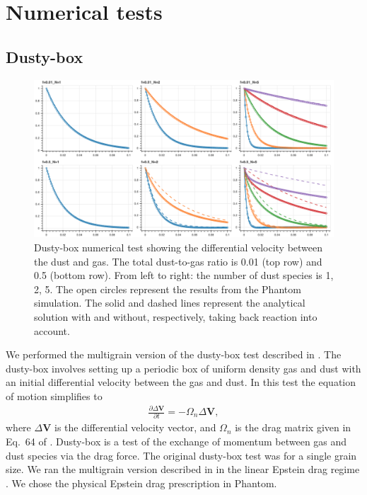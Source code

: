 \documentclass[fleqn,usenatbib]{mnras}
\let\vec\mathbf
\begin{document}
\section{Numerical tests}

\subsection{Dusty-box}

\begin{figure}
   \begin{center}
      \includegraphics[width=\textwidth]{figs/dustybox.png}
      \caption{Dusty-box numerical test showing the differential velocity
         between the dust and gas. The total dust-to-gas ratio is 0.01 (top row)
         and 0.5 (bottom row). From left to right: the number of dust species is
         1, 2, 5. The open circles represent the results from the Phantom
         simulation. The solid and dashed lines represent the analytical
         solution with and without, respectively, taking back reaction into
         account.\label{fig:dustybox}}
   \end{center}
\end{figure}

We performed the multigrain version of the dusty-box test described in
\citet{Laibe2011MNRAS.418.1491L}. The dusty-box involves setting up a periodic
box of uniform density gas and dust with an initial differential velocity
between the gas and dust. In this test the equation of motion simplifies to
%
\begin{align}
   \frac{\partial \Delta \vec{V}}{\partial t} = - \Omega_n \Delta \vec{V},
\end{align}
%
where \(\Delta \vec{V}\) is the differential velocity vector, and \(\Omega_n\)
is the drag matrix given in Eq.~64 of \citet{Laibe2014MNRAS.444.1940L}.
Dusty-box is a test of the exchange of momentum between gas and dust species via
the drag force. The original dusty-box test was for a single grain size. We ran
the multigrain version described in \citet{Laibe2014MNRAS.444.1940L} in the
linear Epstein drag regime \citep{Epstein1924PhRv...23..710E}. We chose the
physical Epstein drag prescription in Phantom.
\end{document}

